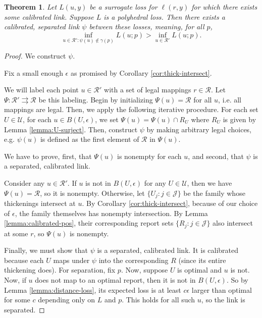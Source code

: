 \documentclass{article}
\newcommand{\R}{\mathcal{R}}
\newcommand{\toto}{\rightrightarrows}
\newtheorem{theorem}{Theorem}
\begin{document}
\begin{theorem}
  Let $L(u,y)$ be a surrogate loss for $\ell(r,y)$ for which there exists some calibrated link.
  Suppose $L$ is a polyhedral loss.
  Then there exists a calibrated, \emph{separated} link $\psi$ between these losses, meaning, for all $p$,
    \[ \inf_{u \in \R' : \psi(u) \not\in \gamma(p)} L(u;p) > \inf_{u \in \R'} L(u;p) . \]
\end{theorem}
\begin{proof}
  We construct $\psi$.
  
  Fix a small enough $\epsilon$ as promised by Corollary \ref{cor:thick-intersect}.
  
  We will label each point $u \in \R'$ with a set of legal mappings $r \in \R$.
  Let $\Psi: \R' \toto \R$ be this labeling.
  Begin by initializing $\Psi(u) = \R$ for all $u$, i.e. all mappings are legal.
  Then, we apply the following iterative procedure.
  For each set $U \in \mathcal{U}$, for each $u \in B(U,\epsilon)$, we set $\Psi(u) = \Psi(u) \cap R_U$ where $R_U$ is given by Lemma \ref{lemma:U-surject}.
  Then, construct $\psi$ by making arbitrary legal choices, e.g. $\psi(u)$ is defined as the first element of $\R$ in $\Psi(u)$.
  
  We have to prove, first, that $\Psi(u)$ is nonempty for each $u$, and second, that $\psi$ is a separated, calibrated link.
  
  Consider any $u \in \R'$.
  If $u$ is not in $B(U,\epsilon)$ for any $U \in \mathcal{U}$, then we have $\Psi(u) = \R$, so it is nonempty.
  Otherwise, let $\{U_j : j \in \mathcal{J}\}$ be the family whose thickenings intersect at $u$.
  By Corollary \ref{cor:thick-intersect}, because of our choice of $\epsilon$, the family themselves has nonempty intersection.
  By Lemma \ref{lemma:calibrated-pos}, their corresponding report sets $\{R_j : j \in \mathcal{J}\}$ also intersect at some $r$, so $\Psi(u)$ is nonempty.
  
  Finally, we must show that $\psi$ is a separated, calibrated link.
  It is calibrated because each $U$ maps under $\psi$ into the corresponding $R$ (since its entire thickening does).
  For separation, fix $p$. Now, suppose $U$ is optimal and $u$ is not.
  Now, if $u$ does not map to an optimal report, then it is not in $B(U,\epsilon)$.
  So by Lemma \ref{lemma:distance-loss}, its expected loss is at least $c\epsilon$ larger than optimal for some $c$ depending only on $L$ and $p$.
  This holds for all such $u$, so the link is separated.
\end{proof}
\end{document}
